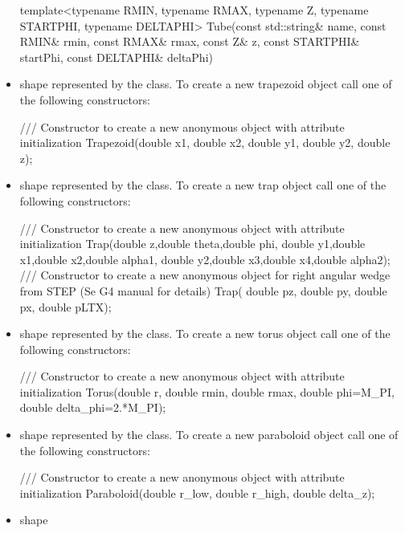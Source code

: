 \documentclass[10pt,a4paper]{article}
\begin{document}
\begin{itemize}
\begin{code}
template<typename RMIN, typename RMAX, typename Z, typename STARTPHI, typename DELTAPHI>
Tube(const std::string& name, const RMIN& rmin, const RMAX& rmax, const Z& z, 
     const STARTPHI& startPhi, const DELTAPHI& deltaPhi)  
\end{code}
\item {} shape
    represented by the  class. To create a new trapezoid
    object call one of the following constructors:
\begin{code} 
/// Constructor to create a new anonymous object with attribute initialization
Trapezoid(double x1, double x2, double y1, double y2, double z);
\end{code}
\item {} shape
    represented by the  class. To create a new trap
    object call one of the following constructors:
\begin{code} 
/// Constructor to create a new anonymous object with attribute initialization
Trap(double z,double theta,double phi,
     double y1,double x1,double x2,double alpha1,
     double y2,double x3,double x4,double alpha2);
/// Constructor to create a new anonymous object for right angular wedge from STEP (Se G4 manual for details)
Trap( double pz, double py, double px, double pLTX);
\end{code}
\item {}  shape
    represented by the  class. To create a new torus
    object call one of the following constructors:
\begin{code}
/// Constructor to create a new anonymous object with attribute initialization
Torus(double r, double rmin, double rmax, double phi=M_PI, double delta_phi=2.*M_PI);
\end{code}
\item {}  shape
    represented by the  class. To create a new paraboloid
    object call one of the following constructors:
\begin{code}
/// Constructor to create a new anonymous object with attribute initialization
Paraboloid(double r_low, double r_high, double delta_z);
\end{code}
\item {} shape

\end{itemize}
\end{document}
